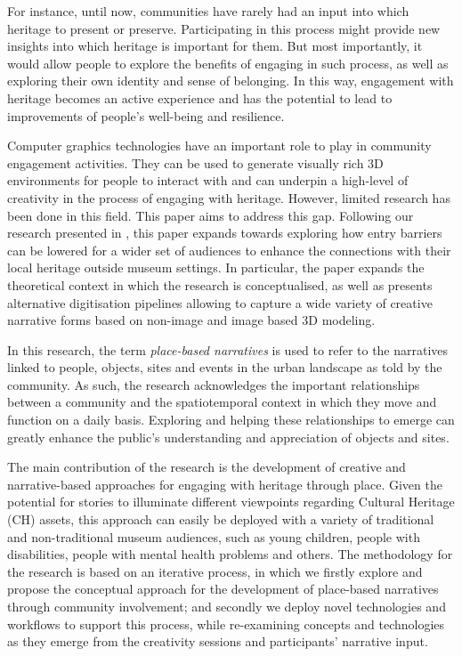 \documentclass[acmlarge,screen,dvipsnames]{acmart}
\begin{document}
For instance, until now, communities have rarely had an input into which heritage to present or preserve. Participating in this process might provide new insights into which
heritage is important for them. But most importantly, it would allow people to explore the benefits of engaging in such process, as well as exploring their own identity and sense of belonging. In this way, engagement with heritage becomes an active experience and has the potential to lead to improvements of people's well-being and resilience. 


Computer graphics technologies have an important role to play in community engagement activities. They can be used to generate visually rich 3D environments for people to interact with and can underpin a high-level of creativity in the process of engaging with heritage. However, limited research has been done in this field.  This paper aims to address this gap. Following our research presented in \cite{6b8314fd76a64d3f86fd627505cc29e9}, this paper expands towards exploring how entry barriers can be lowered for a wider set of audiences to enhance the connections with their local heritage outside museum
settings. In particular, the paper expands the theoretical context in which the research is conceptualised, as well as presents alternative digitisation pipelines allowing to capture a wide variety of creative narrative forms based on non-image and image based 3D modeling. 

In this research, the term \textit{place-based
narratives} is used to refer to the narratives linked to people, objects, sites and events in the urban landscape as told by the community. As such, the research acknowledges the important relationships between a community and the spatiotemporal context in which they move and function on a daily basis. Exploring and helping these relationships to emerge can greatly enhance the public's understanding and appreciation of objects and sites. 

The main contribution of the research is the development of creative and narrative-based
approaches for engaging with heritage through place. Given the potential for stories to illuminate different viewpoints regarding Cultural Heritage (CH) assets, this approach can easily be deployed with a variety of traditional and non-traditional museum audiences, such as young children, people with disabilities, people with mental health problems and others. The methodology for the research is based on an iterative process, in which we firstly explore and propose the conceptual approach for
the development of place-based narratives through community involvement; and
secondly we deploy novel technologies and workflows to support this process, while re-examining concepts and technologies as they emerge from the creativity sessions and participants' narrative input.
\end{document}
